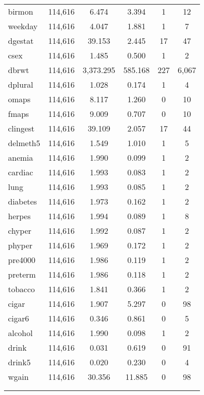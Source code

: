 \documentclass[a4paper, 12pt]{article}
\begin{document}
\begin{table}[!htbp]
\begin{tabular}{@{\extracolsep{5pt}}lccccc}
birmon & 114,616 & 6.474 & 3.394 & 1 & 12 \\ 
weekday & 114,616 & 4.047 & 1.881 & 1 & 7 \\ 
dgestat & 114,616 & 39.153 & 2.445 & 17 & 47 \\ 
csex & 114,616 & 1.485 & 0.500 & 1 & 2 \\ 
dbrwt & 114,616 & 3,373.295 & 585.168 & 227 & 6,067 \\ 
dplural & 114,616 & 1.028 & 0.174 & 1 & 4 \\ 
omaps & 114,616 & 8.117 & 1.260 & 0 & 10 \\ 
fmaps & 114,616 & 9.009 & 0.707 & 0 & 10 \\ 
clingest & 114,616 & 39.109 & 2.057 & 17 & 44 \\ 
delmeth5 & 114,616 & 1.549 & 1.010 & 1 & 5 \\ 
anemia & 114,616 & 1.990 & 0.099 & 1 & 2 \\ 
cardiac & 114,616 & 1.993 & 0.083 & 1 & 2 \\ 
lung & 114,616 & 1.993 & 0.085 & 1 & 2 \\ 
diabetes & 114,616 & 1.973 & 0.162 & 1 & 2 \\ 
herpes & 114,616 & 1.994 & 0.089 & 1 & 8 \\ 
chyper & 114,616 & 1.992 & 0.087 & 1 & 2 \\ 
phyper & 114,616 & 1.969 & 0.172 & 1 & 2 \\ 
pre4000 & 114,616 & 1.986 & 0.119 & 1 & 2 \\ 
preterm & 114,616 & 1.986 & 0.118 & 1 & 2 \\ 
tobacco & 114,616 & 1.841 & 0.366 & 1 & 2 \\ 
cigar & 114,616 & 1.907 & 5.297 & 0 & 98 \\ 
cigar6 & 114,616 & 0.346 & 0.861 & 0 & 5 \\ 
alcohol & 114,616 & 1.990 & 0.098 & 1 & 2 \\ 
drink & 114,616 & 0.031 & 0.619 & 0 & 91 \\ 
drink5 & 114,616 & 0.020 & 0.230 & 0 & 4 \\ 
wgain & 114,616 & 30.356 & 11.885 & 0 & 98 \\ 
\hline \\[-1.8ex] 
\normalsize 
\end{tabular} 
\end{table} 
\end{document}
